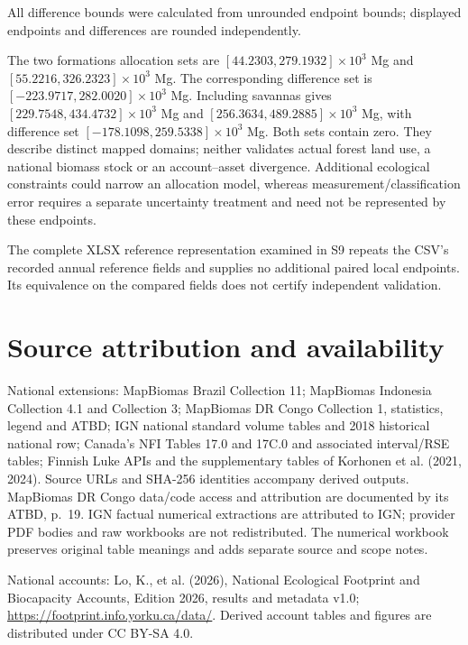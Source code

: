 \documentclass[11pt,a4paper]{article}
\begin{document}
All difference bounds were calculated from unrounded endpoint bounds; displayed endpoints and differences are rounded independently.

The two formations allocation sets are $[44.2303,279.1932]\times10^3$ Mg and $[55.2216,326.2323]\times10^3$ Mg. The corresponding difference set is $[-223.9717,282.0020]\times10^3$ Mg. Including savannas gives $[229.7548,434.4732]\times10^3$ Mg and $[256.3634,489.2885]\times10^3$ Mg, with difference set $[-178.1098,259.5338]\times10^3$ Mg. Both sets contain zero. They describe distinct mapped domains; neither validates actual forest land use, a national biomass stock or an account--asset divergence. Additional ecological constraints could narrow an allocation model, whereas measurement/classification error requires a separate uncertainty treatment and need not be represented by these endpoints.

The complete XLSX reference representation examined in S9 repeats the CSV's recorded annual reference fields and supplies no additional paired local endpoints. Its equivalence on the compared fields does not certify independent validation.






\section*{Source attribution and availability}

National extensions: MapBiomas Brazil Collection 11; MapBiomas Indonesia Collection 4.1 and Collection 3; MapBiomas DR Congo Collection 1, statistics, legend and ATBD; IGN national standard volume tables and 2018 historical national row; Canada's NFI Tables 17.0 and 17C.0 and associated interval/RSE tables; Finnish Luke APIs and the supplementary tables of Korhonen et al. (2021, 2024). Source URLs and SHA-256 identities accompany derived outputs. MapBiomas DR Congo data/code access and attribution are documented by its ATBD, p.~19. IGN factual numerical extractions are attributed to IGN; provider PDF bodies and raw workbooks are not redistributed. The numerical workbook preserves original table meanings and adds separate source and scope notes.

National accounts: Lo, K., et al. (2026), National Ecological Footprint and Biocapacity Accounts, Edition 2026, results and metadata v1.0; \url{https://footprint.info.yorku.ca/data/}. Derived account tables and figures are distributed under CC BY-SA 4.0.
\end{document}
